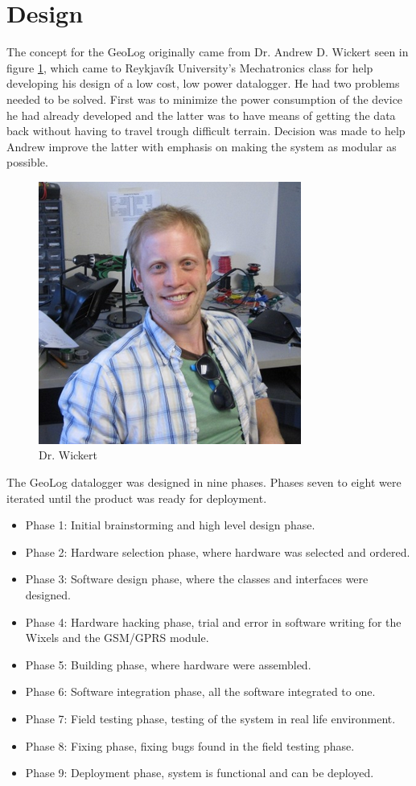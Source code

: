 \section{Design}
The concept for the GeoLog originally came from Dr. Andrew D. Wickert seen in figure 
\ref{fig:andrewWickert}, which came to Reykjavík University's Mechatronics class for 
help developing his design of a low cost, low power datalogger\cite{ALog-BottleLogger}. 
He had two problems needed to be solved. First was to minimize the power consumption of the device he had already developed and the latter was to have means of getting the data
back without having to travel trough difficult terrain. Decision was made to help Andrew 
improve the latter with emphasis on making the system as modular as possible. 
\begin{figure}
\centering
\includegraphics[width=0.4\linewidth]{graphics/andrewWickert}
\caption{Dr. Wickert\label{fig:andrewWickert}\cite{andrewWickert}}
\end{figure}
The GeoLog datalogger was designed in nine phases. Phases seven to eight were iterated
until the product was ready for deployment.
\begin{itemize}
    \item{Phase 1:} Initial brainstorming and high level design phase.
    \item{Phase 2:} Hardware selection phase, where hardware was selected and ordered.
    \item{Phase 3:} Software design phase, where the classes and interfaces were designed.
    \item{Phase 4:} Hardware hacking phase, trial and error in software writing for the
                    Wixels\cite{wixel} and the GSM/GPRS module\cite{SM5100B}.
    \item{Phase 5:} Building phase, where hardware were assembled.
    \item{Phase 6:} Software integration phase, all the software integrated to one.
    \item{Phase 7:} Field testing phase, testing of the system in real life environment.
    \item{Phase 8:} Fixing phase, fixing bugs found in the field testing phase.
    \item{Phase 9:} Deployment phase, system is functional and can be deployed. 
\end{itemize}
